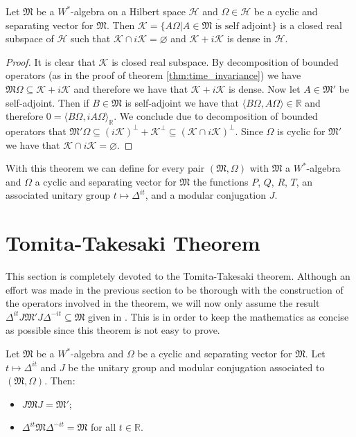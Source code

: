 \begin{theorem}
Let $\mathfrak{M}$ be a $W^*$-algebra on a Hilbert space $\mathcal{H}$ and $\Omega\in\mathcal{H}$ be a cyclic and separating vector for $\mathfrak{M}$. Then $\mathcal{K}=\overline{\{A\Omega|A\in\mathfrak{M}\text{ is self adjoint}\}}$ is a closed real subspace of $\mathcal{H}$ such that $\mathcal{K}\cap i\mathcal{K}=\varnothing$ and $\mathcal{K}+i\mathcal{K}$ is dense in $\mathcal{H}$.
\end{theorem}

\begin{proof}
It is clear that $\mathcal{K}$ is closed real subspace. By decomposition of bounded operators (as in the proof of theorem \ref{thm:time_invariance}) we have $\mathfrak{M}\Omega\subseteq \mathcal{K}+i\mathcal{K}$ and therefore we have that $\mathcal{K}+i\mathcal{K}$ is dense. Now let $A\in\mathfrak{M}'$ be self-adjoint. Then if $B\in\mathfrak{M}$ is self-adjoint we have that $\langle B\Omega,A\Omega\rangle\in\mathbb{R}$ and therefore $0=\langle B\Omega,iA\Omega\rangle_\mathbb{R}$. We conclude due to decomposition of bounded operators that $\mathfrak{M}'\Omega\subseteq (i\mathcal{K})^\bot+\mathcal{K}^\bot\subseteq (\mathcal{K}\cap i\mathcal{K})^\bot$. Since $\Omega$ is cyclic for $\mathfrak{M}'$ we have that $\mathcal{K}\cap i\mathcal{K}=\varnothing$.
\end{proof}

With this theorem we can define for every pair $(\mathfrak{M},\Omega)$ with $\mathfrak{M}$ a $W^*$-algebra and $\Omega$ a cyclic and separating vector for $\mathfrak{M}$ the functions $P$, $Q$, $R$, $T$, an associated unitary group $t\mapsto\Delta^{it}$, and a modular conjugation $J$. 

\section{Tomita-Takesaki Theorem}

This section is completely devoted to the Tomita-Takesaki theorem. Although an effort was made in the previous section to be thorough with the construction of the operators involved in the theorem, we will now only assume the result $\Delta^{it}J\mathfrak{M}'J\Delta^{-it}\subseteq \mathfrak{M}$ given in \cite{Duvenhage1999}\cite{Rieffel1977}. This is in order to keep the mathematics as concise as possible since this theorem is not easy to prove.

\begin{theorem}
Let $\mathfrak{M}$ be a $W^*$-algebra and $\Omega$ be a cyclic and separating vector for $\mathfrak{M}$. Let $t\mapsto\Delta^{it}$ and $J$ be the unitary group and modular conjugation associated to $(\mathfrak{M},\Omega)$. Then:
\begin{itemize}

\item $J\mathfrak{M}J=\mathfrak{M}'$;

\item $\Delta^{it}\mathfrak{M}\Delta^{-it}=\mathfrak{M}$ for all $t\in\mathbb{R}$. 

\end{itemize}
\end{theorem}

